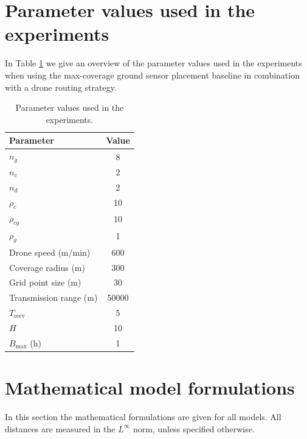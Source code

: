 \documentclass{article}
\begin{document}
\section{Parameter values used in the experiments}\label{appendix:par values}
In Table \ref{tab:parameter_values} we give an overview of the parameter values used in the experiments when using the max-coverage ground sensor placement baseline in combination with a drone routing strategy.
\begin{table}[H]
    \centering
        \caption{Parameter values used in the experiments.}
    \begin{tabular}{lc}
    \toprule
    \textbf{Parameter} & \textbf{Value} \\ \midrule
    $n_g$ & 8 \\
    $n_c$ & 2  \\
    $n_d$ & 2  \\
    $\rho_c$ & 10 \\
    $\rho_{cg}$ & 10 \\
    $\rho_g$ & 1 \\
    Drone speed (m/min) & 600  \\
    Coverage radius (m) & 300 \\
    Grid point size (m) & 30 \\
    Transmission range (m) & 50000 \\
    $T_{\text{reev}}$ & 5  \\
    $H$ & 10  \\
    $B_{\text{max}}$ (h) & 1  \\
    \bottomrule
    \end{tabular}
    \label{tab:parameter_values}
\end{table}

\section{Mathematical model formulations}\label{appendix:math model formulations}
In this section the mathematical formulations are given for all models. All distances are measured in the $L^{\infty}$ norm, unless specified otherwise.  
\end{document}
